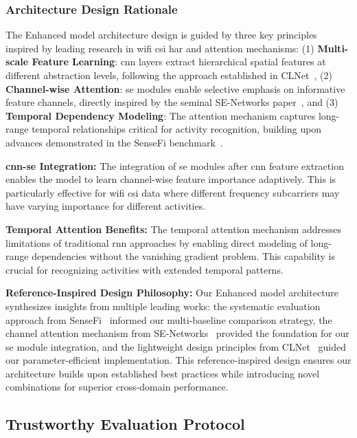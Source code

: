 \documentclass[journal]{IEEEtran}
\begin{document}
\subsubsection{Architecture Design Rationale}

The Enhanced model architecture design is guided by three key principles inspired by leading research in \gls{wifi} \gls{csi} \gls{har} and attention mechanisms: (1) \textbf{Multi-scale Feature Learning}: \gls{cnn} layers extract hierarchical spatial features at different abstraction levels, following the approach established in CLNet~\cite{clnet2021}, (2) \textbf{Channel-wise Attention}: \gls{se} modules enable selective emphasis on informative feature channels, directly inspired by the seminal SE-Networks paper~\cite{se_networks2018}, and (3) \textbf{Temporal Dependency Modeling}: The attention mechanism captures long-range temporal relationships critical for activity recognition, building upon advances demonstrated in the SenseFi benchmark~\cite{yang2023sensefi}.

\textbf{\gls{cnn}-\gls{se} Integration:} The integration of \gls{se} modules after \gls{cnn} feature extraction enables the model to learn channel-wise feature importance adaptively. This is particularly effective for \gls{wifi} \gls{csi} data where different frequency subcarriers may have varying importance for different activities.

\textbf{Temporal Attention Benefits:} The temporal attention mechanism addresses limitations of traditional \gls{rnn} approaches by enabling direct modeling of long-range dependencies without the vanishing gradient problem. This capability is crucial for recognizing activities with extended temporal patterns.

\textbf{Reference-Inspired Design Philosophy:} Our Enhanced model architecture synthesizes insights from multiple leading works: the systematic evaluation approach from SenseFi~\cite{yang2023sensefi} informed our multi-baseline comparison strategy, the channel attention mechanism from SE-Networks~\cite{se_networks2018} provided the foundation for our \gls{se} module integration, and the lightweight design principles from CLNet~\cite{clnet2021} guided our parameter-efficient implementation. This reference-inspired design ensures our architecture builds upon established best practices while introducing novel combinations for superior cross-domain performance.

\subsection{Trustworthy Evaluation Protocol}
\end{document}

